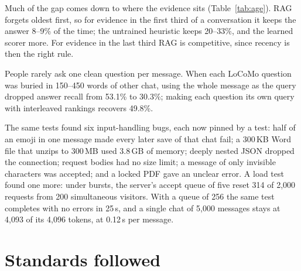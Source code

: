 Much of the gap comes down to where the evidence sits (Table~\ref{tab:age}).
RAG forgets oldest first, so for evidence in the first third of a
conversation it keeps the answer 8--9\% of the time; the untrained heuristic
keeps 20--33\%, and the learned scorer more. For evidence in the last third
RAG is competitive, since recency is then the right rule.

\begin{table}[htbp]
\caption[Answer recall (\%) by the position of a question's evidence, $S=4096$.]{Answer recall (\%) by the position of a question's evidence,
$S=4096$. $^\ast$In-sample on both corpora.}
\label{tab:age}
\centering
\fontsize{10}{12}\selectfont

\end{table}

People rarely ask one clean question per message. When each LoCoMo question
was buried in 150--450 words of other chat, using the whole message as the
query dropped answer recall from 53.1\% to 30.3\%; making each question its
own query with interleaved rankings recovers 49.8\%.

The same tests found six input-handling bugs, each now pinned by a test:
half of an emoji in one message made every later save of that chat fail; a
300\,KB Word file that unzips to 300\,MB used 3.8\,GB of memory; deeply nested
JSON dropped the connection; request bodies had no size limit; a message of
only invisible characters was accepted; and a locked PDF gave an unclear
error. A load test found one more: under bursts, the server's accept queue of
five reset 314 of 2{,}000 requests from 200 simultaneous visitors. With a queue
of 256 the same test completes with no errors in 25\,s, and a single chat of
5{,}000 messages stays at 4{,}093 of its 4{,}096 tokens, at 0.12\,s per message.

\section{Standards followed}
\label{sec:standards}

